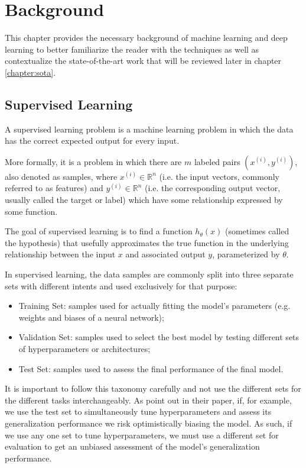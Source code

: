 \chapter{Background}
\label{chapter:background}

This chapter provides the necessary background of machine learning and deep learning to better familiarize the reader with the techniques as well as contextualize the state-of-the-art work that will be reviewed later in chapter \ref{chapter:sota}.

\section{Supervised Learning}

A supervised learning problem is a machine learning problem in which the data has the correct expected output for every input.

More formally, it is a problem in which there are $m$ labeled pairs $(x^{(i)}, y^{(i)})$, also denoted as samples, where $x^{(i)} \in \mathbb{R}^n$ (i.e. the input vectors, commonly referred to as features) and $y^{(i)} \in \mathbb{R}^n$ (i.e. the corresponding output vector, usually called the target or label) which have some relationship expressed by some function.

The goal of supervised learning is to find a function $h_{\theta}(x)$ (sometimes called the hypothesis) that usefully approximates the true function in the underlying relationship between the input $x$ and associated output $y$, parameterized by $\theta$.

In supervised learning, the data samples are commonly split into three separate sets with different intents and used exclusively for that purpose:

\begin{itemize}
    \item Training Set: samples used for actually fitting the model's parameters (e.g. weights and biases of a neural network);
    \item Validation Set: samples used to select the best model by testing different sets of hyperparameters or architectures;
    \item Test Set: samples used to assess the final performance of the final model.
\end{itemize}

It is important to follow this taxonomy carefully and not use the different sets for the different tasks interchangeably. As \citeauthor{crossvalidationbias} point out in their \citeyear{crossvalidationbias} paper, if, for example, we use the test set to simultaneously tune hyperparameters and assess its generalization performance we risk optimistically biasing the model. As such, if we use any one set to tune hyperparameters, we must use a different set for evaluation to get an unbiased assessment of the model's generalization performance.

